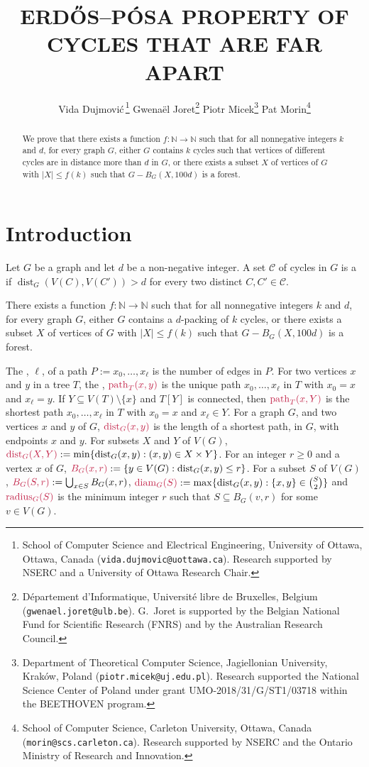 \documentclass{patmorin}
\title{\MakeUppercase{{E}rdős–{P}ósa property of cycles that are far apart}}
\author{
 Vida Dujmovi{\'c}\,\footnote{School of Computer Science and Electrical Engineering, University of Ottawa, Ottawa, Canada (\texttt{vida.dujmovic@uottawa.ca}). Research supported by NSERC and a University of Ottawa Research Chair.}
 \qquad
 Gwena\"el Joret\footnote{D\'epartement d'Informatique, Universit\'e libre de Bruxelles, Belgium ({\tt gwenael.joret@ulb.be}). G.\ Joret is supported by the Belgian National Fund for Scientific Research (FNRS) and by the Australian Research Council.}
 \qquad
 Piotr Micek\footnote{Department of Theoretical Computer Science, Jagiellonian University, Kraków, Poland (\texttt{piotr.micek@uj.edu.pl}). Research supported
 the National Science Center of Poland under grant UMO-2018/31/G/ST1/03718 within the BEETHOVEN program.}
 \qquad
 Pat Morin\footnote{School of Computer Science, Carleton University, Ottawa, Canada (\texttt{morin@scs.carleton.ca}). Research supported by NSERC and the Ontario Ministry of Research and Innovation.}}
\date{}
\DeclareMathOperator{\diam}{diam}
\DeclareMathOperator{\radius}{radius}
\DeclareMathOperator{\pth}{path}
\DeclareMathOperator{\dist}{dist}
\begin{document}
\maketitle

\begin{abstract}
We prove that there exists a function $f:\mathbb{N}\to\mathbb{N}$ such that for all nonnegative integers $k$ and $d$, 
for every graph $G$, 
either $G$ contains $k$ cycles such that vertices of different cycles are in distance more than $d$ in $G$, or 
there exists a subset $X$ of vertices of $G$ with $|X|\leq f(k)$ such that 
$G-B_G(X,100d)$ is a forest.
\end{abstract}

\section{Introduction}

Let $G$ be a graph and let $d$ be a non-negative integer. 
A set $\mathcal{C}$ of cycles in $G$ is a  if $\dist_G(V(C),V(C'))> d$ for every two distinct $C,C'\in\mathcal{C}$.


\begin{thm}\label{thm:main-in-intro}
There exists a function $f:\mathbb{N}\to\mathbb{N}$ such that for all nonnegative integers $k$ and $d$, 
for every graph $G$, 
either $G$ contains a $d$-packing of $k$ cycles, or 
there exists a subset $X$ of vertices of $G$ with $|X|\leq f(k)$ such that 
$G-B_G(X,100d)$ is a forest.
\end{thm}


The , $\ell$, of a path $P:=x_0,\ldots,x_\ell$ is the number of edges in $P$.  For two vertices $x$ and $y$ in a  tree $T$, the , $\mathdefin{\pth_T(x,y)}$ is the unique path $x_0,\ldots,x_\ell$ in $T$ with $x_0=x$ and $x_\ell=y$. If $Y\subseteq V(T)\setminus\{x\}$ and $T[Y]$ is connected, then $\mathdefin{\pth_T(x,Y)}$ is the shortest path $x_0,\ldots,x_{\ell}$ in $T$ with $x_0=x$ and $x_\ell\in Y$.  For a graph $G$, and two vertices $x$ and $y$ of $G$, $\mathdefin{\dist_G(x,y)}$ is the length of a shortest path, in $G$, with endpoints $x$ and $y$.  For subsets $X$ and $Y$ of $V(G)$, $\mathdefin{\dist_G(X,Y)}:=\min\{\dist_G(x,y):(x,y)\in X\times Y\}$.  For an integer $r\ge 0$ and a vertex $x$ of $G$, $\mathdefin{B_G(x,r)}:=\{y\in V(G):\dist_G(x,y)\le r\}$.  For a subset $S$ of $V(G)$, $\mathdefin{B_G(S,r)}:=\bigcup_{x\in S}B_G(x,r)$, $\mathdefin{\diam_G(S)}:=\max\{\dist_G(x,y):\{x,y\}\in\binom{S}{2}\}$ and $\mathdefin{\radius_G(S)}$ is the minimum integer $r$ such that $S\subseteq B_G(v,r)$ for some $v\in V(G)$.
\end{document}
